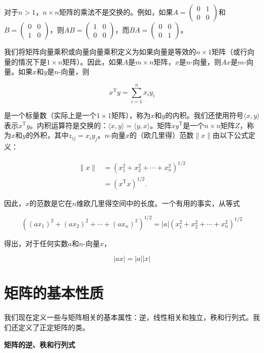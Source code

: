 \documentclass[lang=cn,newtx,10pt,scheme=chinese]{elegantbook}
\begin{document}
对于$n>1$，$n \times n$矩阵的乘法不是交换的。例如，如果$A=(\begin{array}{ll}0 & 1 \\ 0 & 0\end{array})$和$B=(\begin{array}{ll}0 & 0 \\ 1 & 0\end{array})$，则$A B=(\begin{array}{ll}1 & 0 \\ 0 & 0\end{array})$，而$B A=(\begin{array}{ll}0 & 0 \\ 0 & 1\end{array})$。

我们将矩阵向量乘积或向量向量乘积定义为如果向量是等效的$n \times 1$矩阵（或行向量的情况下是$1 \times n$矩阵）。因此，如果$A$是$m \times n$矩阵，$x$是$n$-向量，则$A x$是$m$-向量。如果$x$和$y$是$n$-向量，则

$$
x^{\mathrm{T}} y=\sum_{i=1}^n x_i y_i
$$

是一个标量数（实际上是一个$1 \times 1$矩阵），称为$x$和$y$的内积。我们还使用符号$\langle x, y\rangle$表示$x^{\mathrm{T}} y$。内积运算符是交换的：$\langle x, y\rangle=\langle y, x\rangle$。矩阵$x y^{\mathrm{T}}$是一个$n \times n$矩阵$Z$，称为$x$和$y$的外积，其中$z_{i j}=x_i y_j$。$n$-向量$x$的（欧几里得）范数$\|x\|$由以下公式定义：

$$
\begin{aligned}
\|x\| & =(x_1^2+x_2^2+\cdots+x_n^2)^{1 / 2} \\
& =(x^{\mathrm{T}} x)^{1 / 2} .
\end{aligned}
$$

因此，$x$的范数是它在$n$维欧几里得空间中的长度。一个有用的事实，从等式

$$
((a x_1)^2+(a x_2)^2+\cdots+(a x_n)^2)^{1 / 2}=|a|(x_1^2+x_2^2+\cdots+x_n^2)^{1 / 2}
$$

得出，对于任何实数$a$和$n$-向量$x$，

$$
|ax|=|a||x|
$$

\section{矩阵的基本性质}\label{section:D.2}

我们现在定义一些与矩阵相关的基本属性：逆，线性相关和独立，秩和行列式。我们还定义了正定矩阵的类。

\textbf{矩阵的逆、秩和行列式}
\end{document}
